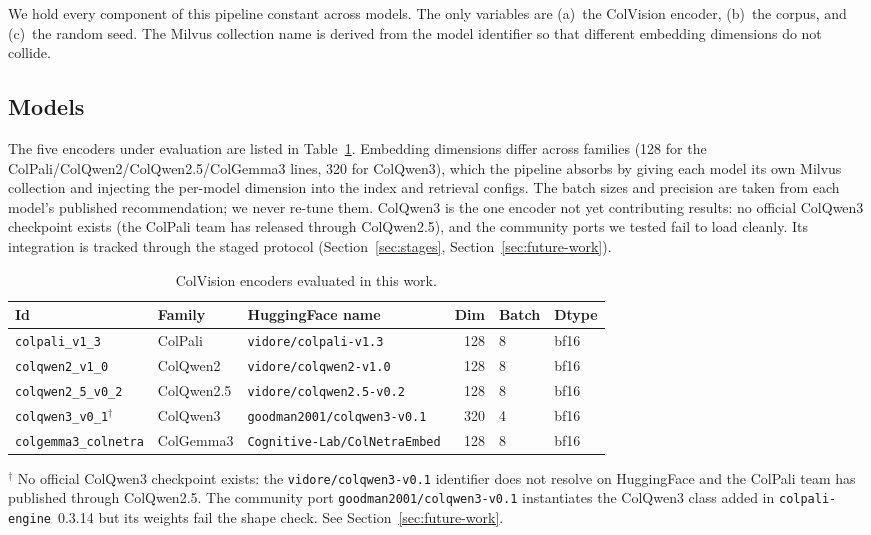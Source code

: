 \documentclass[10pt,a4paper]{article}
\begin{document}
We hold every component of this pipeline constant across models. The only
variables are (a)~the ColVision encoder, (b)~the corpus, and (c)~the random
seed. The Milvus collection name is derived from the model identifier so
that different embedding dimensions do not collide.

\subsection{Models}

The five encoders under evaluation are listed in Table~\ref{tab:models}.
Embedding dimensions differ across families (128 for the
ColPali/ColQwen2/ColQwen2.5/ColGemma3 lines, 320 for ColQwen3), which the
pipeline absorbs by giving each model its own Milvus collection and
injecting the per-model dimension into the index and retrieval configs. The
batch sizes and precision are taken from each model's published
recommendation; we never re-tune them. ColQwen3 is the one encoder not yet
contributing results: no official ColQwen3 checkpoint exists (the ColPali
team has released through ColQwen2.5), and the community ports we tested fail
to load cleanly. Its integration is tracked through the staged protocol
(Section~\ref{sec:stages}, Section~\ref{sec:future-work}).

\begin{table}[h]
  \centering
  \caption{ColVision encoders evaluated in this work.}
  \label{tab:models}
  \begin{tabular}{lllrll}
    \toprule
    Id & Family & HuggingFace name & Dim & Batch & Dtype \\
    \midrule
    \texttt{colpali\_v1\_3}        & ColPali   & \texttt{vidore/colpali-v1.3}        & 128 & 8 & bf16 \\
    \texttt{colqwen2\_v1\_0}       & ColQwen2  & \texttt{vidore/colqwen2-v1.0}       & 128 & 8 & bf16 \\
    \texttt{colqwen2\_5\_v0\_2}    & ColQwen2.5& \texttt{vidore/colqwen2.5-v0.2}     & 128 & 8 & bf16 \\
    \texttt{colqwen3\_v0\_1}$^\dagger$ & ColQwen3 & \texttt{goodman2001/colqwen3-v0.1} & 320 & 4 & bf16 \\
    \texttt{colgemma3\_colnetra}   & ColGemma3 & \texttt{Cognitive-Lab/ColNetraEmbed}& 128 & 8 & bf16 \\
    \bottomrule
  \end{tabular}

  \smallskip
  {\footnotesize $^\dagger$ No official ColQwen3 checkpoint exists: the
  \texttt{vidore/colqwen3-v0.1} identifier does not resolve on HuggingFace and
  the ColPali team has published through ColQwen2.5. The community port
  \texttt{goodman2001/colqwen3-v0.1} instantiates the ColQwen3 class added in
  \texttt{colpali-engine}~0.3.14 but its weights fail the shape check. See
  Section~\ref{sec:future-work}.}
\end{table}
\end{document}
